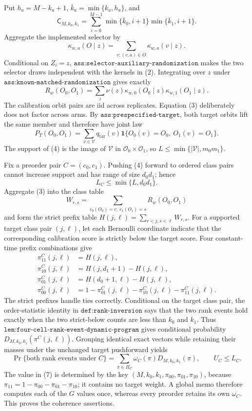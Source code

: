 Put \(h_a=M-k_a+1\), \(\bar k_a=\min\{k_a,h_a\}\), and
\[\mathsf C_{M,k_0,k_1}=\sum_{i=0}^{M-1}\min\{\bar k_0,i+1\}\min\{\bar k_1,i+1\}.\tag{1}\]
Aggregate the implemented selector by
\[\kappa_{w,a}(O\mid z)=\sum_{v:(v,a)\in O}\kappa_{w,a}(v\mid z).\tag{2}\]
Conditional on \(Z_i=z\), \(\texttt{ass:selector-auxiliary-randomization}\) makes the two selector draws independent with the kernels in (2). Integrating over \(z\) under \(\texttt{ass:known-matched-randomization}\) gives exactly
\[R_w(O_0,O_1)=\sum_z\nu(z)\kappa_{w,0}(O_0\mid z)\kappa_{w,1}(O_1\mid z).\tag{3}\]
The calibration orbit pairs are iid across replicates. Equation (3) deliberately does not factor across arms. By \(\texttt{ass:prespecified-target}\), both target orbits lift the same member and therefore have joint law
\[P_T(O_0,O_1)=\sum_{v\in\mathcal V}q_{\mathrm{tar}}(v)\mathbf 1\{O_0(v)=O_0,\ O_1(v)=O_1\}.\tag{4}\]
The support of (4) is the image of \(\mathcal V\) in \(\mathcal O_0\times\mathcal O_1\), so \(L\le\min\{|\mathcal V|,m_0m_1\}\).

Fix a preorder pair \(C=(c_0,c_1)\). Pushing (4) forward to ordered class pairs cannot increase support and has range of size \(d_0d_1\); hence
\[L_C\le\min\{L,d_0d_1\}.\tag{5}\]
Aggregate (3) into the class table
\[W_{r,s}=\sum_{c_0(O_0)=r,\ c_1(O_1)=s}R_w(O_0,O_1)\]
and form the strict prefix table \(H(j,\ell)=\sum_{r<j,s<\ell}W_{r,s}\). For a supported target class pair \((j,\ell)\), let each Bernoulli coordinate indicate that the corresponding calibration score is strictly below the target score. Four constant-time prefix combinations give
\[\begin{aligned}\pi^C_{11}(j,\ell)&=H(j,\ell),\\\pi^C_{10}(j,\ell)&=H(j,d_1+1)-H(j,\ell),\\\pi^C_{01}(j,\ell)&=H(d_0+1,\ell)-H(j,\ell),\\\pi^C_{00}(j,\ell)&=1-\pi^C_{01}(j,\ell)-\pi^C_{10}(j,\ell)-\pi^C_{11}(j,\ell).\end{aligned}\tag{6}\]
The strict prefixes handle ties correctly. Conditional on the target class pair, the order-statistic identity in \(\texttt{def:rank-inversion}\) says that the two rank events hold exactly when the two strict-below counts are less than \(k_0\) and \(k_1\). Thus \(\texttt{lem:four-cell-rank-event-dynamic-program}\) gives conditional probability \(D_{M,k_0,k_1}(\pi^C(j,\ell))\). Grouping identical exact vectors while retaining their masses under the unchanged target pushforward yields
\[\Pr\{\text{both rank events under }C\}=\sum_{\pi\in\Pi_C}\omega_C(\pi)D_{M,k_0,k_1}(\pi),\qquad U_C\le L_C.\tag{7}\]
The value in (7) is determined by the key \((M,k_0,k_1,\pi_{00},\pi_{01},\pi_{10})\), because \(\pi_{11}=1-\pi_{00}-\pi_{01}-\pi_{10}\); it contains no target weight. A global memo therefore computes each of the \(G\) values once, whereas every preorder retains its own \(\omega_C\). This proves the coherence assertions.

